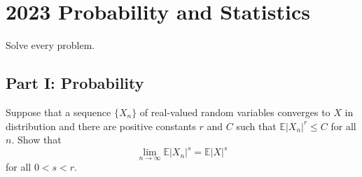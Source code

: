 \section{2023 Probability and Statistics}

Solve every problem.

\subsection{Part I: Probability}

\begin{exercise}\label{probability:2023:1}
Suppose that a sequence $\{X_n\}$ of real-valued random variables converges to $X$ in distribution and there are positive constants $r$ and $C$ such that $\mathbb{E}|X_n|^r \leq C$ for all $n$. Show that
\[
\lim_{n \to \infty} \mathbb{E}|X_n|^s = \mathbb{E}|X|^s
\]
for all $0 < s < r$.
\end{exercise}

